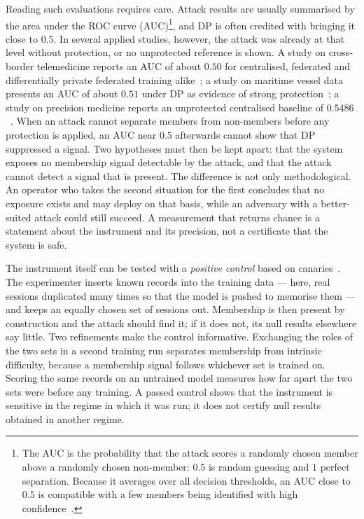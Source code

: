 Reading such evaluations requires care. Attack results are usually summarised
by the area under the ROC curve (AUC)\footnote{The AUC is the probability that
the attack scores a randomly chosen member above a randomly chosen
non-member: $0.5$ is random guessing and $1$ perfect separation. Because it
averages over all decision thresholds, an AUC close to $0.5$ is compatible
with a few members being identified with high
confidence~\cite{carlini2022membership}.}, and DP is often credited with
bringing it close to $0.5$. In several applied studies, however, the attack was
already at that level without protection, or no unprotected reference is
shown. A study on cross-border telemedicine reports an AUC of about $0.50$ for
centralised, federated and differentially private federated training
alike~\cite{meyo2025telemedicine}; a study on maritime vessel data presents an
AUC of about $0.51$ under DP as evidence of strong
protection~\cite{khan2026maritime}; a study on precision medicine reports an
unprotected centralised baseline of $0.5486$~\cite{pasupuleti2025biointelligence}.
When an attack cannot separate members from non-members before any protection
is applied, an AUC near $0.5$ afterwards cannot show that DP suppressed a
signal. Two hypotheses must then be kept apart: that the system exposes no
membership signal detectable by the attack, and that the attack cannot detect
a signal that is present. The difference is not only methodological. An
operator who takes the second situation for the first concludes that no
exposure exists and may deploy on that basis, while an adversary with a
better-suited attack could still succeed. A measurement that returns chance
is a statement about the instrument and its precision, not a certificate that
the system is safe.

The instrument itself can be tested with a \emph{positive control} based on
canaries~\cite{maddock2023canife,steinke2023privacy}. The experimenter inserts
known records into the training data --- here, real sessions duplicated many
times so that the model is pushed to memorise them --- and keeps an equally
chosen set of sessions out. Membership is then present by construction and
the attack should find it; if it does not, its null results elsewhere say
little. Two refinements make the control informative. Exchanging the roles of
the two sets in a second training run separates membership from intrinsic
difficulty, because a membership signal follows whichever set is trained on.
Scoring the same records on an untrained model measures how far apart the two
sets were before any training. A passed control shows that the instrument is
sensitive in the regime in which it was run; it does not certify null results
obtained in another regime.

